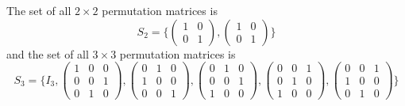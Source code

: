   \begin{example}
    \label{ex:the-2times2-permutation-matrices}
    The set of all $2 \times 2$ permutation matrices is 
    \begin{equation}
      S_2 = \bigg\{  \begin{pmatrix}1 & 0 \\0 & 1 \end{pmatrix}, \begin{pmatrix}1 & 0 \\0 & 1 \end{pmatrix} \bigg\}
    \end{equation}
    and the set of all $3 \times 3$ permutation matrices is
    \begin{equation}
      S_3 = \Bigg\{I_3, 
      \begin{pmatrix}1 & 0 & 0 \\0 & 0 & 1 \\0 & 1 & 0 \end{pmatrix},
      \begin{pmatrix}0 & 1 & 0 \\1 & 0 & 0 \\0 & 0 & 1 \end{pmatrix}, 
      \begin{pmatrix}0 & 1 & 0 \\0 & 0 & 1 \\1 & 0 & 0 \end{pmatrix}, 
      \begin{pmatrix}0 & 0 & 1 \\0 & 1 & 0 \\1 & 0 & 0 \end{pmatrix}, 
      \begin{pmatrix}0 & 0 & 1 \\1 & 0 & 0 \\0 & 1 & 0 \end{pmatrix} \Bigg\}
    \end{equation}
  \end{example}

